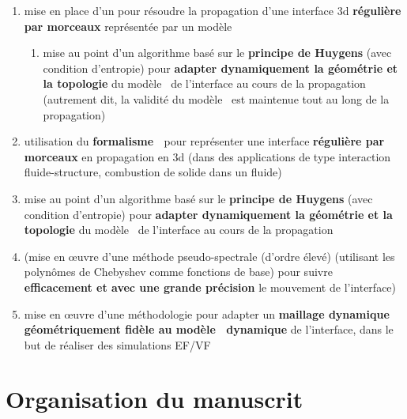 \begin{enumerate}
	\item mise en place d'un  pour résoudre la propagation d'une interface 3d \textbf{régulière par morceaux} représentée par un modèle \brep
	\begin{enumerate}
		\item mise au point d'un algorithme basé sur le \textbf{principe de Huygens} (avec condition d'entropie) pour \textbf{adapter dynamiquement la géométrie et la topologie} du modèle \brep\ de l'interface au cours de la propagation (autrement dit, la validité du modèle \brep\ est maintenue tout au long de la propagation)
	\end{enumerate}


	\item utilisation du \textbf{formalisme \brep\ }pour représenter une interface \textbf{régulière par morceaux} en propagation en 3d (dans des applications de type interaction fluide-structure, combustion de solide dans un fluide)
	\item mise au point d'un algorithme basé sur le \textbf{principe de Huygens} (avec condition d'entropie) pour \textbf{adapter dynamiquement la géométrie et la topologie} du modèle \brep\ de l'interface au cours de la propagation
	\item (mise en \oe uvre d'une méthode pseudo-spectrale (\ie d'ordre élevé) (utilisant les polynômes de Chebyshev comme fonctions de base) pour suivre \textbf{efficacement et avec une grande précision} le mouvement de l'interface)
	\item mise en \oe uvre d'une méthodologie pour adapter un \textbf{maillage dynamique géométriquement fidèle au modèle \brep\ dynamique} de l'interface, dans le but de réaliser des simulations EF/VF
\end{enumerate}


\section{Organisation du manuscrit}